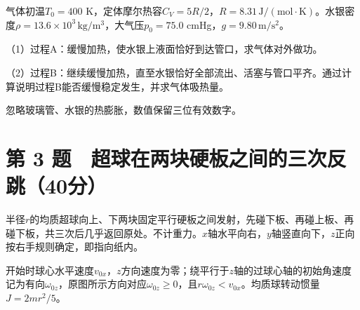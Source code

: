 \documentclass[12pt,a4paper,fontset=fandol]{ctexart}
\begin{document}
气体初温\(T_0=400\)
K，定体摩尔热容\(C_V=5R/2\)，\(R=8.31\,\mathrm{J/(mol\cdot K)}\)。水银密度\(\rho=13.6\times10^3\,\mathrm{kg/m^3}\)，大气压\(p_0=75.0\)
cmHg，\(g=9.80\,\mathrm{m/s^2}\)。

\begin{center}
\begin{minipage}{\linewidth}
\centering\begingroup{}
\ifdim\wd\diagrambox>.88\linewidth
\sbox{\diagrambox}{\resizebox{.88\linewidth}{!}{\usebox{\diagrambox}}}\fi
\ifdim\ht\diagrambox>.20\textheight
\resizebox{!}{.20\textheight}{\usebox{\diagrambox}}
\else\usebox{\diagrambox}\fi
\par{}\endgroup\end{minipage}\end{center}

（1）过程A：缓慢加热，使水银上液面恰好到达管口，求气体对外做功。

（2）过程B：继续缓慢加热，直至水银恰好全部流出、活塞与管口平齐。通过计算说明过程B能否缓慢稳定发生，并求气体吸热量。

忽略玻璃管、水银的热膨胀，数值保留三位有效数字。

\clearpage

\section{第 3
题　超球在两块硬板之间的三次反跳（40分）}\label{ux7b2c-3-ux9898-ux8d85ux7403ux5728ux4e24ux5757ux786cux677fux4e4bux95f4ux7684ux4e09ux6b21ux53cdux8df340ux5206}

半径\(r\)的均质超球向上、下两块固定平行硬板之间发射，先碰下板、再碰上板、再碰下板，共三次后几乎返回原处。不计重力。\(x\)轴水平向右，\(y\)轴竖直向下，\(z\)正向按右手规则确定，即指向纸内。

开始时球心水平速度\(v_{0x}\)，\(z\)方向速度为零；绕平行于\(z\)轴的过球心轴的初始角速度记为有向\(\omega_{0z}\)，原图所示方向对应\(\omega_{0z}\geq0\)，且\(r\omega_{0z}<v_{0x}\)。均质球转动惯量\(J=2mr^2/5\)。
\end{document}
